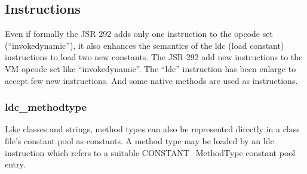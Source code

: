 \documentclass{sigplanconf}
\def \Jsr{JSR\xspace}
\def \JSR{\Jsr 292\xspace}
\def \VM{VM\xspace}
\begin{document}
% 
% 


    \subsection{Instructions}
      Even if formally the \JSR adds only one instruction to the opcode set (``invokedynamic''),
      it also enhances the semantics of the ldc (load constant) instructions to load two new constants.
      The \JSR add new instructions to the \VM opcode set like ``invokedynamic''.
      The ``ldc'' instruction has been enlarge to accept few new instructions.
      And some native methods are used as instructions.

      \subsubsection{ldc\_methodtype}
        Like classes and strings, method types can also be
        represented directly in a class file's constant pool as constants.
        A method type may be loaded by an ldc instruction which refers to a suitable
        CONSTANT\_MethodType constant pool entry.
\end{document}
